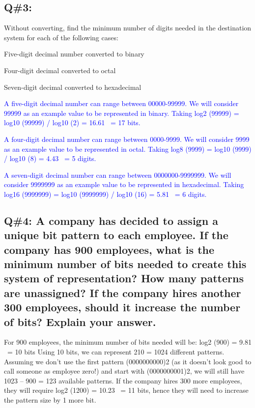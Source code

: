 \subsection{Q\#3:} Without converting, find the minimum number of digits needed in the destination system for each of the following cases:
\begin{itemize}
    \item[a)] Five-digit decimal number converted to binary
    \item[b)] Four-digit decimal converted to octal
    \item[c)] Seven-digit decimal converted to hexadecimal
    \newline
    \textcolor{blue}{
    \item[a)] A five-digit decimal number can range between 00000-99999. We will consider 99999 as an example
value to be represented in binary. Taking log2 (99999) = log10 (99999) / log10 (2) = 16.61 ~= 17 bits.
    \item[b)] A four-digit decimal number can range between 0000-9999. We will consider 9999 as an example
value to be represented in octal. Taking log8 (9999) = log10 (9999) / log10 (8) = 4.43 ~= 5 digits.
    \item[c)] A seven-digit decimal number can range between 0000000-9999999. We will consider 9999999 as
an example value to be represented in hexadecimal.
Taking log16 (9999999) = log10 (9999999) / log10 (16) = 5.81 ~= 6 digits.
    }
\end{itemize}
\vspace{1.5em}
\subsection{Q\#4: A company has decided to assign a unique bit pattern to each employee. If the company has 900
employees, what is the minimum number of bits needed to create this system of representation? How
many patterns are unassigned? If the company hires another 300 employees, should it increase the
number of bits? Explain your answer.}
For 900 employees, the minimum number of bits needed will be: log2 (900) = 9.81 ~= 10 bits
Using 10 bits, we can represent 210 = 1024 different patterns. Assuming we don’t use the first pattern
(0000000000)2 (as it doesn’t look good to call someone as employee zero!) and start with
(0000000001)2, we will still have 1023 – 900 = 123 available patterns.
If the company hires 300 more employees, they will require log2 (1200) = 10.23 ~= 11 bits, hence they
will need to increase the pattern size by 1 more bit.
\vspace{1.5em}

